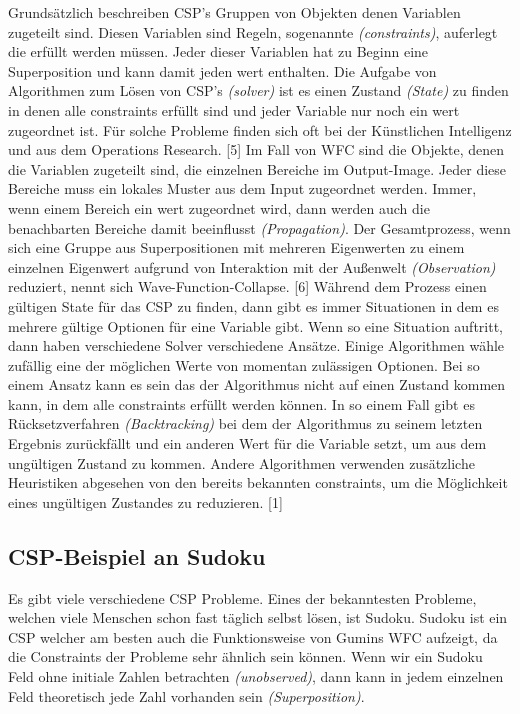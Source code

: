 \documentclass[12pt]{report}
\begin{document}
Grundsätzlich beschreiben CSP's Gruppen von Objekten denen Variablen zugeteilt sind.
Diesen Variablen sind Regeln, sogenannte \textit{(constraints)}, auferlegt die erfüllt werden müssen.
Jeder dieser Variablen hat zu Beginn eine Superposition und kann damit jeden wert enthalten.
Die Aufgabe von Algorithmen zum Lösen von CSP's \textit{(solver)} ist es einen Zustand \textit{(State)} zu finden in denen alle constraints erfüllt sind und jeder Variable nur noch ein wert zugeordnet ist.
Für solche Probleme finden sich oft bei der Künstlichen Intelligenz und aus dem Operations Research. {[5]}
Im Fall von WFC sind die Objekte, denen die Variablen zugeteilt sind, die einzelnen Bereiche im Output-Image.
Jeder diese Bereiche muss ein lokales Muster aus dem Input zugeordnet werden.
Immer, wenn einem Bereich ein wert zugeordnet wird, dann werden auch die benachbarten Bereiche damit beeinflusst \textit{(Propagation)}.
Der Gesamtprozess, wenn sich eine Gruppe aus Superpositionen mit mehreren Eigenwerten zu einem einzelnen Eigenwert aufgrund von Interaktion mit der Außenwelt \textit{(Observation)} reduziert,
nennt sich Wave-Function-Collapse. {[6]}
Während dem Prozess einen gültigen State für das CSP zu finden, dann gibt es immer Situationen in dem es mehrere gültige Optionen für eine Variable gibt.
Wenn so eine Situation auftritt, dann haben verschiedene Solver verschiedene Ansätze.
Einige Algorithmen wähle zufällig eine der möglichen Werte von momentan zulässigen Optionen.
Bei so einem Ansatz kann es sein das der Algorithmus nicht auf einen Zustand kommen kann, in dem alle constraints erfüllt werden können.
In so einem Fall gibt es Rücksetzverfahren \textit{(Backtracking)} bei dem der Algorithmus zu seinem letzten Ergebnis zurückfällt und ein anderen Wert für die Variable setzt, um aus dem
ungültigen Zustand zu kommen.
Andere Algorithmen verwenden zusätzliche Heuristiken abgesehen von den bereits bekannten constraints, um die Möglichkeit eines ungültigen Zustandes zu reduzieren. {[1]}

\subsection{CSP-Beispiel an Sudoku}

Es gibt viele verschiedene CSP Probleme.
Eines der bekanntesten Probleme, welchen viele Menschen schon fast täglich selbst lösen, ist Sudoku.
Sudoku ist ein CSP welcher am besten auch die Funktionsweise von Gumins WFC aufzeigt, da die Constraints der Probleme sehr ähnlich sein können.
\newline
Wenn wir ein Sudoku Feld ohne initiale Zahlen betrachten \textit{(unobserved)}, dann kann in jedem einzelnen Feld theoretisch jede Zahl vorhanden sein \textit{(Superposition)}.
\end{document}
